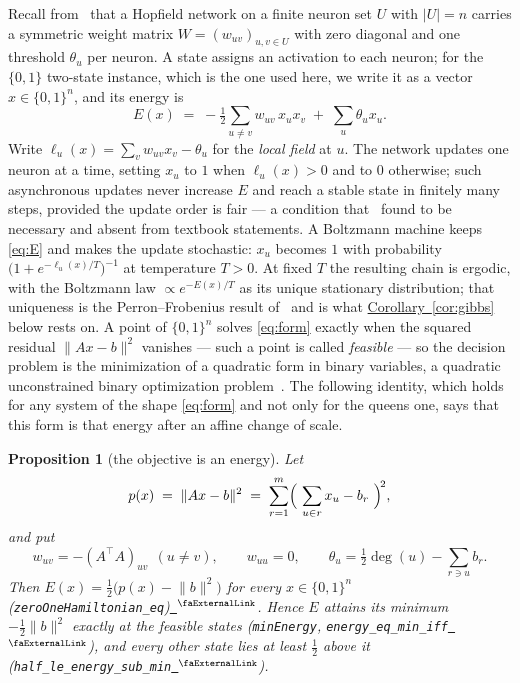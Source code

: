 \documentclass{easychair}
\newtheorem{proposition}[thm]{Proposition}
\newcommand{\citeref}[1]{\textcolor{academicpurple}{\cite{#1}}}
\newcommand{\corref}[1]{\textcolor{academicpurple}{\hyperref[#1]{Corollary~\ref*{#1}}}}
\newcommand{\extlink}{~\ensuremath{{}^\text{\faExternalLink}}}
\newcommand{\repoowner}{mkaratarakis/HNBM}
\newcommand{\reporef}{1bd91612ee31180f6c99fa11090b713f3012ead4}
\newcommand{\repo}{https://github.com/\repoowner/blob/\reporef}
\newcommand{\srcl}[2]{\href{\repo/#1\#L#2}{\extlink}}
\newcommand{\qusrc}[2]{\srcl{HopfieldNet/QUBO/#1}{#2}}
\begin{document}
Recall from~\citeref{hnbm} that a Hopfield network on a finite neuron set $U$ with $|U| = n$ carries
a symmetric weight matrix $W = (w_{uv})_{u,v \in U}$ with zero diagonal and one threshold $\theta_u$
per neuron. A state assigns an activation to each neuron; for the $\{0,1\}$ two-state instance,
which is the one used here, we write it as a vector $x \in \{0,1\}^{n}$, and its energy is
\begin{equation}\label{eq:E}
  E(x) \;=\; -\tfrac12\sum_{u \ne v} w_{uv}\,x_u x_v \;+\; \sum_u \theta_u x_u .
\end{equation}
Write $\ell_u(x) = \sum_v w_{uv}x_v - \theta_u$ for the \emph{local field} at $u$. The network
updates one neuron at a time, setting $x_u$ to $1$ when $\ell_u(x) > 0$ and to $0$ otherwise; such
asynchronous updates never increase $E$ and reach a stable state in finitely many steps, provided
the update order is fair --- a condition that~\citeref{hnbm} found to be necessary and absent from
textbook statements. A Boltzmann machine keeps \eqref{eq:E} and makes the update stochastic: $x_u$
becomes $1$ with probability $\bigl(1 + e^{-\ell_u(x)/T}\bigr)^{-1}$ at temperature $T > 0$. At
fixed $T$ the resulting chain is ergodic, with the Boltzmann law $\propto e^{-E(x)/T}$ as its unique
stationary distribution; that uniqueness is the Perron--Frobenius result of~\citeref{hnbm} and is
what \corref{cor:gibbs} below rests on. A point of $\{0,1\}^{n}$ solves \eqref{eq:form}
exactly when the squared residual $\lVert Ax - b\rVert^2$ vanishes --- such a point is called
\emph{feasible} --- so the decision problem is the minimization of a quadratic form in binary
variables, a quadratic unconstrained binary optimization
problem~\citeref{lucas2014,glover2019}. The following identity, which holds for any
system of the shape \eqref{eq:form} and not only for the queens one, says that this form is that
energy after an affine change of scale.

\begin{proposition}[the objective is an energy]\label{prop:energy}
Let
\begin{equation}\label{eq:p}
  p(x) \;=\; \lVert Ax - b\rVert^2
        \;=\; \sum_{r=1}^{m}\Bigl(\ \sum_{u \in r} x_u - b_r\ \Bigr)^{\!2} ,
\end{equation}
and put
\begin{equation}\label{eq:WT}
  w_{uv} = -(A^{\top}\!A)_{uv} \ \ (u \ne v), \qquad
  w_{uu} = 0, \qquad
  \theta_u = \tfrac12\deg(u) - \sum_{r \ni u} b_r .
\end{equation}
Then $E(x) = \tfrac12\bigl(p(x) - \lVert b\rVert^2\bigr)$ for every $x \in \{0,1\}^{n}$
(\lstinline{zeroOneHamiltonian_eq})\qusrc{Net.lean}{353}. Hence $E$
attains its minimum $-\tfrac12\lVert b\rVert^2$ exactly at the feasible states
(\lstinline{minEnergy}, \lstinline{energy_eq_min_iff}\qusrc{Minimizers.lean}{130}), and every other
state lies at least $\tfrac12$ above it
(\lstinline{half_le_energy_sub_min}\qusrc{Minimizers.lean}{145}).
\end{proposition}
\end{document}
